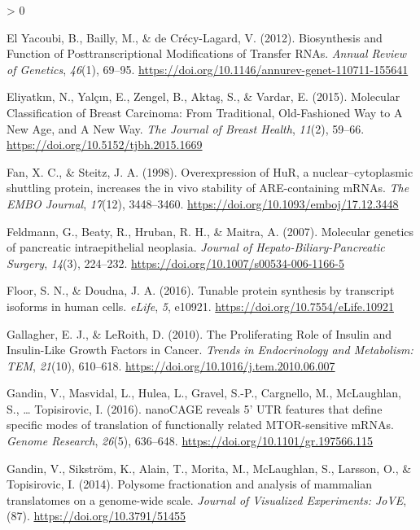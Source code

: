 \documentclass[
  12pt,
  openany]{book}
\newlength{\cslhangindent}
\newenvironment{CSLReferences}[2] %
 {%
  \setlength{\parindent}{0pt}
  \ifodd #1 \everypar{\setlength{\hangindent}{\cslhangindent}}\ignorespaces\fi
  \ifnum #2 > 0
  \setlength{\parskip}{#2\baselineskip}
  \fi
 }%
 {}
\begin{document}
\begin{CSLReferences}{1}{0}
\leavevmode\hypertarget{ref-ElYacoubi2012}{}%
El Yacoubi, B., Bailly, M., \& de Crécy-Lagard, V. (2012). Biosynthesis and {Function} of {Posttranscriptional Modifications} of {Transfer RNAs}. \emph{Annual Review of Genetics}, \emph{46}(1), 69--95. \url{https://doi.org/10.1146/annurev-genet-110711-155641}

\leavevmode\hypertarget{ref-Eliyatkin2015}{}%
Eliyatkın, N., Yalçın, E., Zengel, B., Aktaş, S., \& Vardar, E. (2015). Molecular {Classification} of {Breast Carcinoma}: {From Traditional}, {Old}-{Fashioned Way} to {A New Age}, and {A New Way}. \emph{The Journal of Breast Health}, \emph{11}(2), 59--66. \url{https://doi.org/10.5152/tjbh.2015.1669}

\leavevmode\hypertarget{ref-Fan1998}{}%
Fan, X. C., \& Steitz, J. A. (1998). Overexpression of {HuR}, a nuclear--cytoplasmic shuttling protein, increases the in vivo stability of {ARE}-containing {mRNAs}. \emph{The EMBO Journal}, \emph{17}(12), 3448--3460. \url{https://doi.org/10.1093/emboj/17.12.3448}

\leavevmode\hypertarget{ref-Feldmann2007}{}%
Feldmann, G., Beaty, R., Hruban, R. H., \& Maitra, A. (2007). Molecular genetics of pancreatic intraepithelial neoplasia. \emph{Journal of Hepato-Biliary-Pancreatic Surgery}, \emph{14}(3), 224--232. \url{https://doi.org/10.1007/s00534-006-1166-5}

\leavevmode\hypertarget{ref-Floor2016}{}%
Floor, S. N., \& Doudna, J. A. (2016). Tunable protein synthesis by transcript isoforms in human cells. \emph{eLife}, \emph{5}, e10921. \url{https://doi.org/10.7554/eLife.10921}

\leavevmode\hypertarget{ref-Gallagher2010}{}%
Gallagher, E. J., \& LeRoith, D. (2010). The {Proliferating Role} of {Insulin} and {Insulin}-{Like Growth Factors} in {Cancer}. \emph{Trends in Endocrinology and Metabolism: TEM}, \emph{21}(10), 610--618. \url{https://doi.org/10.1016/j.tem.2010.06.007}

\leavevmode\hypertarget{ref-Gandin2016a}{}%
Gandin, V., Masvidal, L., Hulea, L., Gravel, S.-P., Cargnello, M., McLaughlan, S., \ldots{} Topisirovic, I. (2016). {nanoCAGE} reveals 5' {UTR} features that define specific modes of translation of functionally related {MTOR}-sensitive {mRNAs}. \emph{Genome Research}, \emph{26}(5), 636--648. \url{https://doi.org/10.1101/gr.197566.115}

\leavevmode\hypertarget{ref-Gandin2014}{}%
Gandin, V., Sikström, K., Alain, T., Morita, M., McLaughlan, S., Larsson, O., \& Topisirovic, I. (2014). Polysome fractionation and analysis of mammalian translatomes on a genome-wide scale. \emph{Journal of Visualized Experiments: JoVE}, (87). \url{https://doi.org/10.3791/51455}


\end{CSLReferences}
\end{document}

